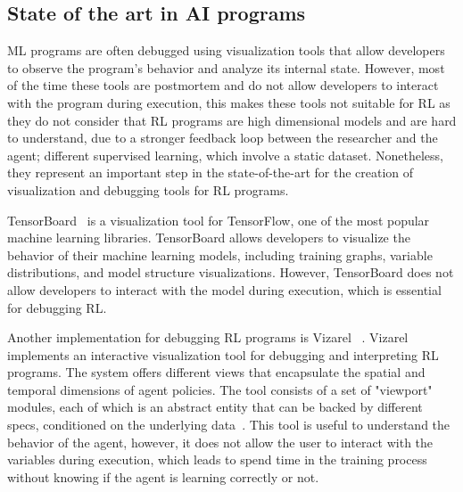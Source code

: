 \subsection{State of the art in \ac{AI} programs}
\label{sec:ai}

\ac{ML} programs are often debugged using visualization 
tools that allow developers to observe the program's behavior and analyze its internal state. 
However, most of the time these tools are postmortem and do not allow developers to interact 
with the program during execution, this makes these tools not suitable for \ac{RL} as they 
do not consider that \ac{RL} programs are high dimensional models and are hard to understand, 
due to a stronger feedback loop between the researcher and the agent; different 
supervised learning, which involve a static dataset. Nonetheless, they 
represent an important step in the state-of-the-art for the creation of visualization 
and debugging tools for \ac{RL} programs.

TensorBoard~\cite{tensorboard} is a 
visualization tool for TensorFlow, one of the most popular machine learning libraries. 
TensorBoard allows developers to visualize the behavior of their machine learning models, 
including training graphs, variable distributions, and model structure visualizations. However, 
TensorBoard does not allow developers to interact with the model during execution, which is 
essential for debugging \ac{RL}.

Another implementation for debugging \ac{RL} programs is \ac{Vizarel} ~\cite{deshpande2020interactivevisualizationdebuggingrl}.
\ac{Vizarel} implements an interactive visualization tool for debugging and interpreting \ac{RL} 
programs. The system offers different views that encapsulate the spatial and temporal dimensions 
of agent policies. The tool consists of a set of "viewport" modules, each of which is an abstract 
entity that can be backed by different specs, conditioned on the underlying data~\cite{deshpande2020interactivevisualizationdebuggingrl}. This tool 
is useful to understand the behavior of the agent, however, it does not allow the user to interact with the 
variables during execution, which leads to spend time in the training process without knowing if
the agent is learning correctly or not.

